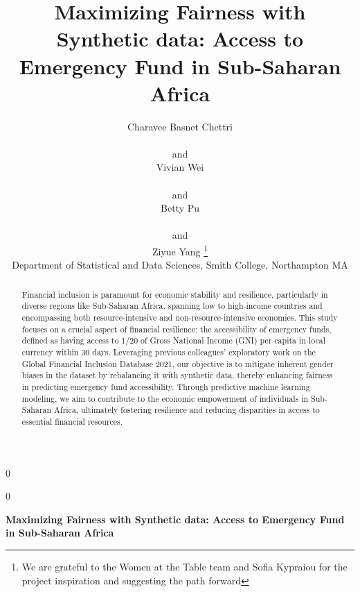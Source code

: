 \documentclass[12pt]{article}
\newcommand{\blind}{0}
\begin{document}
\def\spacingset#1{\renewcommand{\baselinestretch}%
{#1}\small\normalsize} \spacingset{1}



\blind
{
  \title{\bf Maximizing Fairness with Synthetic data: Access to
Emergency Fund in Sub-Saharan Africa}

  \author{
        Charavee Basnet Chettri \\
    \\
     and \\     Vivian Wei \\
    \\
     and \\     Betty Pu \\
    \\
     and \\     Ziyue Yang \thanks{We are grateful to the Women at the
Table team and Sofia Kypraiou for the project inspiration and suggesting
the path forward} \\
    Department of Statistical and Data Sciences, Smith College,
Northampton MA\\
      }
  \maketitle
} \fi

\blind
{
  \bigskip
  \bigskip
  \bigskip
  \begin{center}
    {\LARGE\bf Maximizing Fairness with Synthetic data: Access to
Emergency Fund in Sub-Saharan Africa}
  \end{center}
  \medskip
} \fi

\bigskip
\begin{abstract}
Financial inclusion is paramount for economic stability and resilience,
particularly in diverse regions like Sub-Saharan Africa, spanning low to
high-income countries and encompassing both resource-intensive and
non-resource-intensive economies. This study focuses on a crucial aspect
of financial resilience: the accessibility of emergency funds, defined
as having access to 1/20 of Gross National Income (GNI) per capita in
local currency within 30 days. Leveraging previous colleagues'
exploratory work on the Global Financial Inclusion Database 2021, our
objective is to mitigate inherent gender biases in the dataset by
rebalancing it with synthetic data, thereby enhancing fairness in
predicting emergency fund accessibility. Through predictive machine
learning modeling, we aim to contribute to the economic empowerment of
individuals in Sub-Saharan Africa, ultimately fostering resilience and
reducing disparities in access to essential financial resources.
\end{abstract}
\end{document}

